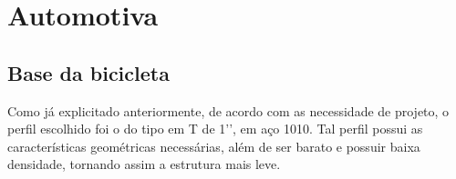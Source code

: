\chapter[Automotiva]{Automotiva}
\label{cha:automotiva_desenvolvimento}


\section{Base da bicicleta}
Como já explicitado anteriormente, de acordo com as necessidade de projeto, o perfil escolhido foi o do tipo em T de 1’’, em aço 1010. Tal perfil possui as características geométricas necessárias, além de ser barato e possuir baixa densidade, tornando assim a estrutura mais leve.

